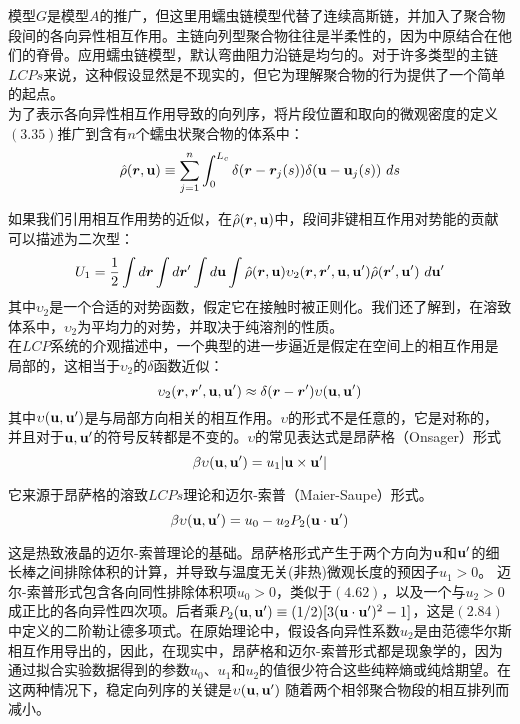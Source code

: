 模型$G$是模型$A$的推广，但这里用蠕虫链模型代替了连续高斯链，并加入了聚合物段间的各向异性相互作用。主链向列型聚合物往往是半柔性的，因为中原结合在他们的脊骨。应用蠕虫链模型，默认弯曲阻力沿链是均匀的。对于许多类型的主链$LCPs$来说，这种假设显然是不现实的，但它为理解聚合物的行为提供了一个简单的起点。\\

为了表示各向异性相互作用导致的向列序，将片段位置和取向的微观密度的定义$(3.35)$推广到含有$n$个蠕虫状聚合物的体系中：\\
\begin{equation}
\hat{\rho}(\bm{r},\mathbf{u}) \equiv \sum_{j=1}^{n} \int _{0}^{L_{c}} \delta(\bm{r}-\bm{r}_{j}(s)) \delta (\mathbf{u}-\mathbf{u}_{j}(s))~ds
\end{equation}

如果我们引用相互作用势的近似，在$\hat{\rho}(\bm{r},\mathbf{u})$中，段间非键相互作用对势能的贡献可以描述为二次型：\\
\begin{equation}
U_1=\frac{1}{2} \int d\bm{r} \int d\bm{r}' \int d\mathbf{u} \int  \hat{\rho}(\bm{r},\mathbf{u}) \upsilon_2(\bm{r},\bm{r}',\mathbf{u},\mathbf{u}') \hat{\rho}(\bm{r}',\mathbf{u}')~d\mathbf{u}'
\end{equation}
其中$\upsilon_2$是一个合适的对势函数，假定它在接触时被正则化。我们还了解到，在溶致体系中，$\upsilon_2$为平均力的对势，并取决于纯溶剂的性质。\\

在$LCP$系统的介观描述中，一个典型的进一步逼近是假定在空间上的相互作用是局部的，这相当于$\upsilon_2$的$\delta$函数近似：\\
\begin{equation}
\upsilon_{2}(\bm{r},\bm{r}',\mathbf{u},\mathbf{u}') \approx \delta(\bm{r}-\bm{r}') \upsilon(\mathbf{u},\mathbf{u}')
\end{equation}
其中$\upsilon(\mathbf{u},\mathbf{u}')$是与局部方向相关的相互作用。$\upsilon$的形式不是任意的，它是对称的，并且对于$\mathbf{u},\mathbf{u}'$的符号反转都是不变的。$\upsilon$的常见表达式是昂萨格（Onsager）形式\\
\begin{equation}
\beta \upsilon(\mathbf{u},\mathbf{u}')= u_{1}|\mathbf{u}\times \mathbf{u}'|
\end{equation}

它来源于昂萨格的溶致$LCPs$理论和迈尔-索普（Maier-Saupe）形式。\\
\begin{equation}
\beta \upsilon(\mathbf{u},\mathbf{u}')=u_0 - u_{2} P_{2}(\mathbf{u} \cdot \mathbf{u}')
\end{equation}

这是热致液晶的迈尔-索普理论的基础。昂萨格形式产生于两个方向为$\mathbf{u}$和$\mathbf{u}'$的细长棒之间排除体积的计算，并导致与温度无关(非热)微观长度的预因子$u_{1}>0$。 迈尔-索普形式包含各向同性排除体积项$u_{0}>0$，类似于$(4.62)$，以及一个与$u_2>0$成正比的各向异性四次项。后者乘$P_{2}(\mathbf{u},\mathbf{u}')\equiv (1/2)[3(\mathbf{u}\cdot \mathbf{u}')^2-1]$，这是$(2.84)$中定义的二阶勒让德多项式。在原始理论中，假设各向异性系数$u_2$是由范德华尔斯相互作用导出的，因此，在现实中，昂萨格和迈尔-索普形式都是现象学的，因为通过拟合实验数据得到的参数$u_0$、$u_1$和$u_2$的值很少符合这些纯粹熵或纯焓期望。在这两种情况下，稳定向列序的关键是$\upsilon (\mathbf{u},\mathbf{u}')$ 随着两个相邻聚合物段的相互排列而减小。\\

